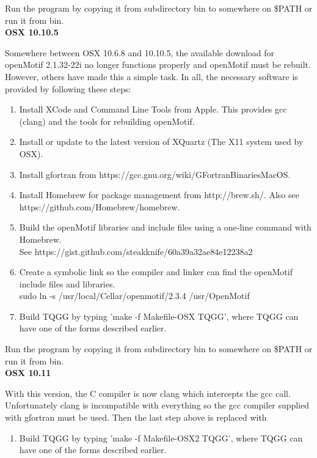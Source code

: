 \documentclass{article}
\begin{document}
Run the program by copying it from subdirectory bin to somewhere on \$PATH or run it from bin. \\

{\bf{OSX 10.10.5}}

Somewhere between OSX 10.6.8 and 10.10.5, the available download for openMotif 2.1.32-22i no longer 
functions properly and openMotif must be rebuilt. However, others have made this a simple task.
In all, the necessary software is provided by following these steps:
\begin{enumerate}
 \item Install XCode and Command Line Tools from Apple. This provides gcc (clang) and the tools
 for rebuilding openMotif.
 \item Install or update to the latest version of XQuartz (The X11 system used by OSX). 
 \item Install gfortran from https://gcc.gnu.org/wiki/GFortranBinariesMacOS.
 \item Install Homebrew for package management from http://brew.sh/. Also see https://github.com/Homebrew/homebrew.
 \item Build the openMotif libraries and include files using a one-line command with Homebrew.\\ 
 See https://gist.github.com/steakknife/60a39a32ae84e12238a2
 \item Create a symbolic link so the compiler and linker can find the openMotif include files and libraries.\\
 sudo ln -s /usr/local/Cellar/openmotif/2.3.4 /usr/OpenMotif
 \item Build TQGG by typing 'make -f Makefile-OSX TQGG', where TQGG can have one of the forms described earlier.
\end{enumerate}

Run the program by copying it from subdirectory bin to somewhere on \$PATH or run it from bin. \\ 

{\bf{OSX 10.11}}

With this version, the C compiler is now clang which intercepts the gcc call. Unfortunately clang is
incompatible with everything so the gcc compiler supplied with gfortran must be used. Then the last step
above is replaced with

\begin{enumerate}
 \item Build TQGG by typing 'make -f Makefile-OSX2 TQGG', where TQGG can have one of the forms described earlier.
\end{enumerate}
\end{document}
